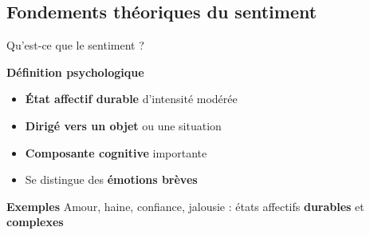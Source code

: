 \subsection{Fondements théoriques du sentiment}

\begin{frame}{Qu'est-ce que le sentiment ?}
    \begin{block}{\centering \textbf{Définition psychologique}}
        \begin{itemize}
            \setlength\itemsep{0.6em}
            \item \textbf{État affectif durable} d'intensité modérée
            \item \textbf{Dirigé vers un objet} ou une situation
            \item \textbf{Composante cognitive} importante
            \item Se distingue des \textbf{émotions brèves}
        \end{itemize}
    \end{block}
    
    \vspace{0.3cm}
    
    \begin{exampleblock}{\centering \textbf{Exemples}}
        \centering
        Amour, haine, confiance, jalousie : états affectifs \textbf{durables} et \textbf{complexes}
    \end{exampleblock}
\end{frame}

